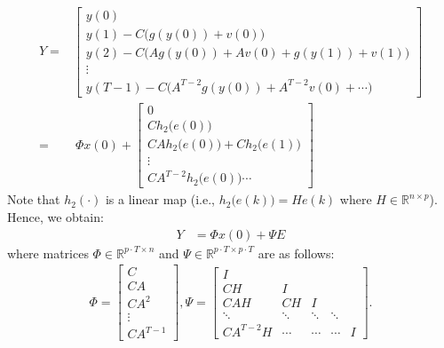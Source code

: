 \begin{equation}
\begin{aligned}
	Y=&\begin{bmatrix} y(0) \\ y(1) - C \big(g(y(0)) + v(0) \big) \\
	y(2) - C \big( A g(y(0)) + Av(0)  + g(y(1))  + v(1) \big)\\ \vdots \\ y(T-1) - C \big(A^{T-2} g(y(0)) + A^{T-2} v(0) + \cdots \big) \end{bmatrix}  \\
	=&~\Phi x(0) +
	\begin{bmatrix} 0 \\ C h_2 \big(e(0) \big) \\ C A h_2 \big(e(0) \big) + C h_2 \big(e(1) \big)  \\ \vdots  \\ C A^{T-2} h_2 \big(e(0) \big)  \cdots \end{bmatrix}
\end{aligned}
\end{equation}
Note that $h_2(\cdot)$ is a linear map (i.e., $h_2 \big(e(k) \big) = H e(k)$ where $H \in \mathbb{R}^{n \times p }$). Hence, we obtain:
\begin{equation}\label{linear_feed}
\begin{aligned}
Y &= \Phi x(0) + \Psi E
\end{aligned}
\end{equation}
where matrices $\Phi \in \mathbb{R}^{p\cdot T \times n}$ and $\Psi \in \mathbb{R}^{p\cdot T \times p\cdot T}$ are as follows:
\begin{equation}
\begin{aligned}
\Phi=\begin{bmatrix} C \\ CA \\ CA^2 \\ \vdots \\ CA^{T-1} \end{bmatrix},
\Psi = \begin{bmatrix} I & & & &   \\
CH & I & & \\
CAH & CH & I & \\
\ddots & \ddots  &  \ddots &  \ddots & \\
CA^{T-2} H & \cdots & \cdots & \cdots & I
\end{bmatrix}.\nonumber
\end{aligned}
\end{equation}
